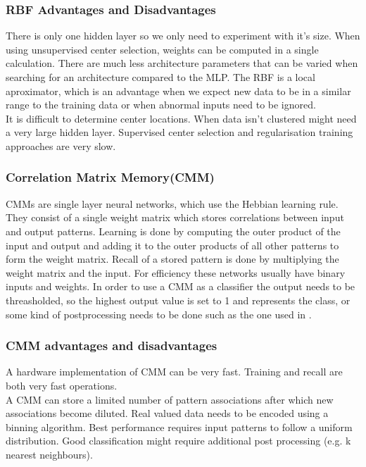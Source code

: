 \documentclass[a4paper, 11pt]{article}
\begin{document}
\subsubsection*{RBF Advantages and Disadvantages}
There is only one hidden layer so we only need to experiment with it's size. When using unsupervised center selection, weights can be computed in a single calculation. There are much less architecture parameters that can be varied when searching for an  architecture compared to the MLP. The RBF is a local aproximator, which is an advantage when we expect new data to be in a similar range to the training data or when abnormal inputs need to be ignored. \\
It is difficult to determine center locations. When data isn't clustered might need a very large hidden layer.  Supervised center selection and regularisation training approaches are very slow. 

\subsubsection*{Correlation Matrix Memory(CMM)}
CMMs are single layer neural networks, which use the Hebbian learning rule. They consist of a single weight matrix which stores correlations between input and output patterns. Learning is done by computing the outer product of the input and output and adding it to the outer products of all other patterns to form the weight matrix. Recall of a stored pattern is done by multiplying the weight matrix and the input. For efficiency these networks usually have binary inputs and weights. In order to use a CMM as a classifier the output needs to be threasholded, so the highest output value is set to 1 and represents the class, or some kind of postprocessing needs to be done such as the one used in \cite{Zhou1998}.  
\subsubsection*{CMM advantages and disadvantages}
A hardware implementation of CMM can be very fast. Training and recall are both very fast operations. \\
A CMM can store a limited number of pattern associations after which new associations become diluted. Real valued data needs to be encoded using a binning algorithm. Best performance requires input patterns to follow a uniform distribution. Good classification might require additional post processing (e.g. k nearest neighbours).
\end{document}
